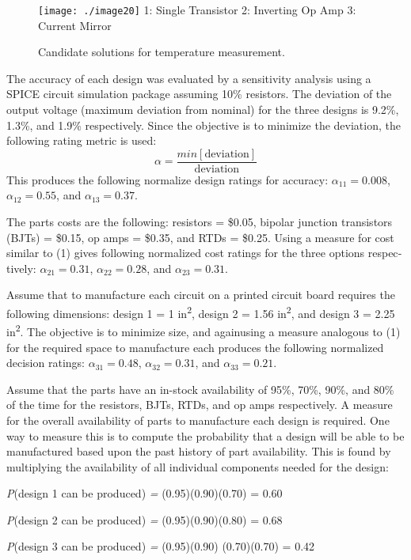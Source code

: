 \begin{figure}
\caption{Candidate solutions for temperature measurement.}
\texttt{[image: ./image20]}
1: Single Transistor 2: Inverting Op Amp 3: Current Mirror
\label{figure:solutionsTemperature}
\end{figure}

The accuracy of each design was evaluated by a sensitivity analysis
using a SPICE cir­cuit simulation package assuming 10\% resistors. The
deviation of the output volt­age (maximum deviation from nominal) for the
three designs is 9.2\%, 1.3\%, and 1.9\% respectively. Since the
objective is to minimize the deviation, the following rating metric is
used:
$$ \alpha = \frac{min[\text{deviation}]}{\text{deviation}}$$
This produces the following normalize design ratings for accuracy:
$\alpha_{11} = 0.008$, 
$\alpha_{12} = 0.55$, and 
$\alpha_{13} = 0.37$.

The parts costs are the following: resistors = \$0.05, bipolar junction
transistors (BJTs) = \$0.15, op amps = \$0.35, and RTDs = \$0.25. Using
a measure for cost similar to (1) gives following normalized cost
ratings for the three options
respec­tively:
$\alpha_{21} = 0.31$, 
$\alpha_{22} = 0.28$, and 
$\alpha_{23} = 0.31$.

Assume that to manufacture each circuit on a printed circuit board
requires the following dimen­sions: design 1 = 1 in\textsuperscript{2},
design 2 = 1.56 in\textsuperscript{2}, and design 3 = 2.25
in\textsuperscript{2}. The objective is to minimize size, and againusing
a measure analogous to (1) for the required space to manufacture each
produces the following normalized decision ratings:
$\alpha_{31} = 0.48$, 
$\alpha_{32} = 0.31$, and 
$\alpha_{33} = 0.21$.

Assume that the parts have an in-stock availability of 95\%, 70\%, 90\%,
and 80\% of the time for the resistors, BJTs, RTDs, and op amps
respectively. A measure for the overall availability of parts to
manufacture each design is re­quired. One way to measure this is to
compute the probability that a design will be able to be manufactured
based upon the past history of part availability. This is found by
multiplying the availability of all individual components needed for the
design:

\emph{P}(design 1 can be produced) \emph{=} (0.95)(0.90)(0.70) = 0.60

\emph{P}(design 2 can be produced) \emph{=} (0.95)(0.90)(0.80) = 0.68

\emph{P}(design 3 can be produced) \emph{=} (0.95)(0.90) (0.70)(0.70) = 0.42

